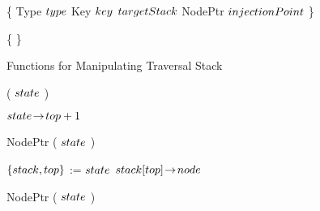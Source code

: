 \begin{limitscope}
\begin{algorithm}[tb]
\DontPrintSemicolon
\Struct \OpRecord{} \{\;
\PrintSemicolon
\label{lin:local-op|record:begin}
\Indp 
   \Enum Type $type$\;
	 Key $key$\;
	 \TraversalRecord{} $targetStack$\;
	 NodePtr $injectionPoint$\;
	 \BlankLine
\Indm
\}\;
\label{lin:local-op|record:end}

\BlankLine

\DontPrintSemicolon
\Struct \SeekRecord \{\;
\PrintSemicolon
\label{lin:local-seek|record:begin}
\Indp 
\Indm 
\}\;
\label{lin:local-seek|record:end}

\label{lin:local-data|structures:end}
\end{algorithm}





\begin{algorithm}[tb]
\caption{Functions for Manipulating Traversal Stack} 
\label{algo:local-stack|functions}
\DefineKeyWords
\DontPrintSemicolon
\Integer \Size( $state$ )\;
\PrintSemicolon
\label{lin:local-stack|begin}
\label{lin:local-size:begin}
\Begin
{
   
   \Return $state \!\rightarrow\! top + 1$\;
	 \label{lin:local-size:end}
}
\BlankLine
\DontPrintSemicolon
NodePtr \GetTop( $state$ )\;
\PrintSemicolon
\label{lin:local-get|top:begin}
\Begin
{
   
   $\{  stack, top  \}$ := $state$\;
	 \label{lin:local-stack|retrieve}
	 \Return $stack[top] \!\rightarrow\! node$\;
	 \label{lin:local-get|top:end}
}
\BlankLine
\DontPrintSemicolon
NodePtr \GetSecondToTop( $state$ )\;
\label{lin:local-get|second|to|top:begin}
\PrintSemicolon
\Begin
{
   
}
\end{algorithm}
\end{limitscope}
